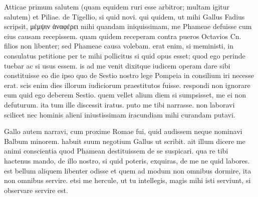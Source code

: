 


 Atticae primum salutem (quam equidem ruri esse arbitror; multam igitur salutem) et Piliae. de Tigellio, si quid novi. qui quidem, ut mihi Gallus Fadius scripsit, μέμψιν ἀναφέρει mihi quandam iniquissimam, me Phameae defuisse cum eius causam recepissem. quam quidem receperam contra pueros Octavios Cn. filios non libenter; sed Phameae causa volebam. erat enim, si meministi, in consulatus petitione per te mihi pollicitus si quid opus esset; quod ego perinde tuebar ac si usus essem. is ad me venit dixitque iudicem operam dare sibi constituisse eo die ipso quo de Sestio nostro lege Pompeia in consilium iri necesse erat. scis enim dies illorum iudiciorum praestitutos fuisse. respondi non ignorare eum quid ego deberem Sestio. quem vellet alium diem si sumpsisset, me ei non defuturum. ita tum ille discessit iratus. puto me tibi narrasse. non laboravi scilicet nec hominis alieni iniustissimam iracundiam mihi curandam putavi.

 Gallo autem narravi, cum proxime Romae fui, quid audissem neque nominavi Balbum minorem. habuit suum negotium Gallus ut scribit. ait illum dicere me animi conscientia quod Phamean destituissem de se suspicari. qua re tibi hactenus mando, de illo nostro, si quid poteris, exquiras, de me ne quid labores. est bellum aliquem libenter odisse et quem ad modum non omnibus dormire, ita non omnibus servire. etsi me hercule, ut tu intellegis, magis mihi isti serviunt, si observare servire est.

